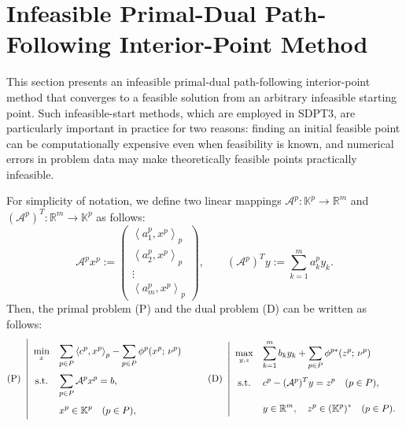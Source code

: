 \section{Infeasible Primal-Dual Path-Following Interior-Point Method}
\label{sec:infeasible_IPM}
This section presents an infeasible primal-dual path-following interior-point method that converges to a feasible solution from an arbitrary infeasible starting point.
Such infeasible-start methods, which are employed in SDPT3, are particularly important in practice for two reasons: finding an initial feasible point can be computationally expensive even when feasibility is known, and numerical errors in problem data may make theoretically feasible points practically infeasible.

For simplicity of notation, we define two linear mappings 
$\mathcal{A}^p : \mathbb{K}^p \to \mathbb{R}^m$ and 
$(\mathcal{A}^p)^T : \mathbb{R}^m \to \mathbb{K}^p$ 
as follows:
\[
  \mathcal{A}^p x^p
  := 
  \begin{pmatrix}
      \left\langle a^p_1, x^p \right\rangle_p \\
      \left\langle a^p_2, x^p \right\rangle_p \\
      \vdots \\
      \left\langle a^p_m, x^p \right\rangle_p
  \end{pmatrix},
  \qquad
  (\mathcal{A}^p)^T y
  :=
  \sum_{k=1}^m a^p_k y_k.
\]
Then, the primal problem (P) and the dual problem (D) can be written as follows:
\[
  \everymath{\displaystyle}
  \renewcommand{\arraystretch}{2.0}
  \text{(P)}~
  \left|
  \begin{array}{cl}
      \min_{x} & \displaystyle
       \sum_{p \in P} \left\langle c^p, x^p \right\rangle_p - \sum_{p \in P} \phi^p(x^p;\, \nu^p) \\[3pt]
      \text{s.t.} & \displaystyle
       \sum_{p \in P} \mathcal{A}^p x^p = b,\\[3pt]
      & x^p \in \mathbb{K}^p \quad (p \in P),
  \end{array}
  \right.
  \qquad
  \text{(D)}~
  \left|
  \begin{array}{cl}
      \max_{y,z} & \displaystyle
       \sum_{k=1}^m b_k y_k 
          + \sum_{p \in P} \phi^{p*}(z^p;\, \nu^p) \\[3pt]
      \text{s.t.} & \displaystyle
       c^p - (\mathcal{A}^p)^T y = z^p \quad (p \in P),\\[3pt]
      & y \in \mathbb{R}^m, \quad z^p \in (\mathbb{K}^p)^* \quad (p \in P).
  \end{array}
  \right.
\]

